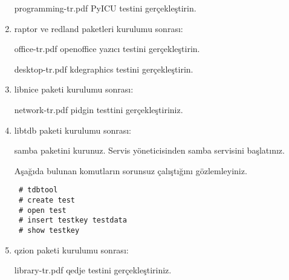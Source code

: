 \documentclass[a4paper,10pt]{article}
\begin{document}
\begin{enumerate}
programming-tr.pdf PyICU testini gerçekleştirin.

\item raptor ve redland paketleri kurulumu sonrası:

office-tr.pdf openoffice yazıcı testini gerçekleştirin.

desktop-tr.pdf kdegraphics testini gerçekleştirin.

\item libnice paketi kurulumu sonrası:

network-tr.pdf pidgin testtini gerçekleştiriniz.

\item libtdb paketi kurulumu sonrası:

samba paketini kurunuz. Servis yöneticisinden samba servisini başlatınız.

Aşağıda bulunan komutların sorunsuz çalıştığını gözlemleyiniz.
\begin{verbatim}
 # tdbtool
 # create test
 # open test 
 # insert testkey testdata
 # show testkey
\end{verbatim}
\item qzion paketi kurulumu sonrası:

library-tr.pdf qedje testini gerçekleştiriniz.

\end{enumerate}
\end{document}
